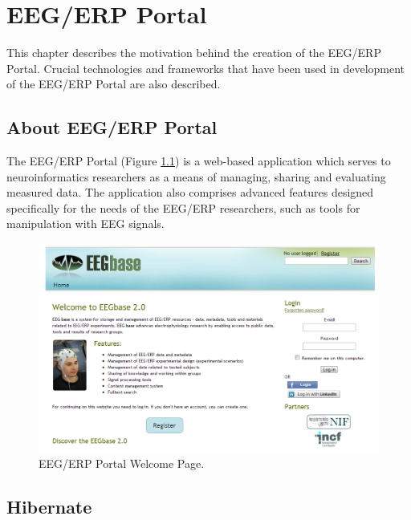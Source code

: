 \chapter{EEG/ERP Portal}
\label{chap:eegPortal}

This chapter describes the motivation behind the creation of the EEG/ERP Portal. Crucial technologies and frameworks that have been used in development of the EEG/ERP Portal are also described.

\section{About EEG/ERP Portal}

The EEG/ERP Portal (Figure \ref{fig:eegPortal}) is a web-based application which serves to neuroinformatics researchers as a means of managing, sharing and evaluating measured data. The application also comprises advanced features designed specifically for the needs of the EEG/ERP researchers, such as tools for manipulation with EEG signals.


\begin{figure}[h!]
	\centering
		\includegraphics[width=1.00\textwidth]{figures/eegPortal.png}
	\caption{EEG/ERP Portal Welcome Page.}
	\label{fig:eegPortal}
\end{figure}


\section{Hibernate}

